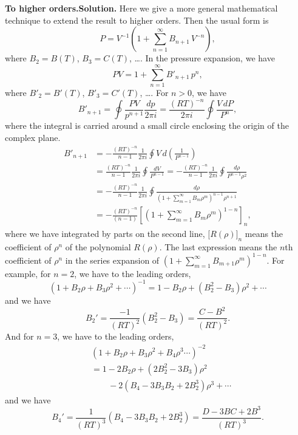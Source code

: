 \documentclass[twocolumn, 10pt]{article}
\numberwithin{equation}{section}
\newenvironment{solution}[1][\empty]
{\par\medskip\sffamily
  \textbf{\ifx\empty#1{Solution.}\relax\else{#1}\fi} \ignorespaces}
{\medskip}
\begin{document}
\begin{solution}[To higher orders.]
  Here we give a more general mathematical technique
  to extend the result to higher orders.
  Then the usual form is
  $$
  P = V^{-1} \left(1 + \sum_{n=1}^\infty B_{n+1} \, V^{-n}\right),
  $$
  where $B_2 = B(T)$, $B_3 = C(T)$, \dots.
  In the pressure expansion, we have
  $$
  P V = 1 + \sum_{n=1}^\infty B'_{n+1} \, p^n,
  $$
  where $B'_2 = B'(T)$, $B'_3 = C'(T)$, \dots.
  For $n > 0$, we have
  $$
  B'_{n+1}
  =
  \oint \frac{ P V } { p^{n+1} } \frac{d p}{2\pi i}
  =\frac{(RT)^{-n}}{2\pi i}
  \oint \frac{ V \, d P } { P^n }
  ,
  $$
  where the integral is carried around a small circle
  enclosing the origin of the complex plane.
  \begin{align*}
    B'_{n+1}
    &= -\frac{(RT)^{-n}}{n-1}
    \frac{1}{2\pi i} \oint V \, d \left( \frac{ 1 } { P^{n-1} } \right)
    \\
    &= \frac{(RT)^{-n}}{n-1}
    \frac{1}{2\pi i} \oint \frac{ d V } { P^{n-1} }
    = -\frac{(RT)^{-n}}{n-1}
    \frac{1}{2\pi i} \oint \frac{ d \rho } { P^{n-1} \rho^2 }
    \\
    &=
    -\frac{(RT)^{-n}}{n-1}
    \frac{1}{2\pi i} \oint
    \frac{ d \rho } { (1+\sum_{m=1}^\infty B_m \rho^m )^{n-1} \rho^{n+1} }
    \\
    &= -\frac{(RT)^{-n}}{(n-1)}
      \left[
        \left(1+\sum_{m=1}^\infty B_m \rho^m \right)^{1-n}
      \right]_n
    ,
  \end{align*}
  where
  we have integrated by parts on the second line,
  $\bigl[ R(\rho) \bigr]_n$
  means the coefficient of $\rho^n$ of the polynomial $R(\rho)$.
  The last expression means
  the $n$th coefficient of $\rho^n$
  in the series expansion
  of $\left(1+\sum_{m=1}^\infty B_{m+1} \rho^m \right)^{1-n}$.
  For example, for $n = 2$, we have
  to the leading orders,
  $$
  (1 + B_2 \rho + B_3 \rho^2 + \cdots)^{-1}
  =
  1 - B_2 \rho + (B_2^2 - B_3) \rho^2 + \cdots
  $$
  and we have
  $$
  B_2' = \frac{-1}{(RT)^2} (B_2^2 - B_3)
  = \frac{ C - B^2 } { (RT)^2 }.
  $$
  And for $n = 3$, we have
  to the leading orders,
  \begin{align*}
  &\left( 1 + B_2 \rho + B_3 \rho^2 + B_4 \rho^3 \cdots \right)^{-2}
  \\
  &=
  1 - 2 B_2 \rho + (2 B_2^2 - 3 B_3) \rho^2
  \\
  &\qquad
    - 2 (B_4 - 3 B_3 B_2 + 2B_2^3) \rho^3
    + \cdots
  \end{align*}
  and we have
  $$
  B_4' = \frac{1}{(RT)^3} (B_4 - 3 B_3 B_2 + 2 B_2^3)
  = \frac{ D - 3 B C + 2 B^3 } { (RT)^3 }.
  $$
\end{solution}
\end{document}
